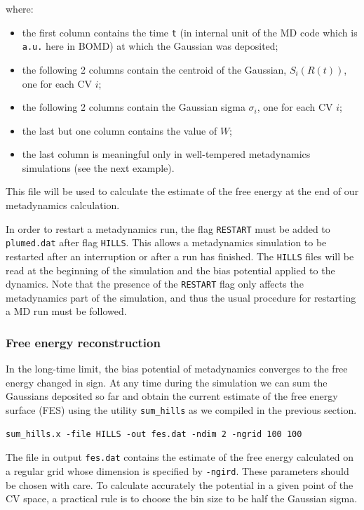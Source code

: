 \documentclass[12pt,a4paper]{article}
\begin{document}
where:

\begin{itemize}
\item the first column contains the time \texttt{t} (in internal unit of the MD code which is \texttt{a.u.} here in BOMD) at which the Gaussian was deposited;
\item the following 2 columns contain the centroid of the Gaussian, $S_{i}(R(t))$, one for each CV $i$;
\item the following 2 columns contain the Gaussian sigma $\sigma_{i}$, one for each CV $i$;
\item the last but one column contains the value of $W$;
\item the last column is meaningful only in well-tempered metadynamics simulations (see the next example).
\end{itemize}

This file will be used to calculate the estimate of the free energy at the end of our metadynamics calculation.

In order to restart a metadynamics run, the flag \texttt{RESTART} must be added to \texttt{plumed.dat} after flag \texttt{HILLS}. This allows a metadynamics simulation to be restarted after an interruption or after a run has finished. The \texttt{HILLS} files will be read at the beginning of the simulation and the bias potential applied to the dynamics. Note that the presence of the \texttt{RESTART} flag only affects the metadynamics part of the simulation, and thus the usual procedure for restarting a MD run must be followed.

\subsubsection{Free energy reconstruction}

In the long-time limit, the bias potential of metadynamics converges to the free energy changed in sign\cite{Bussi:2006gg}. At any time during the simulation we can sum the Gaussians deposited so far and obtain the current estimate of the free energy surface (FES) using the utility \texttt{sum\_hills} as we compiled in the previous section.

\begin{verbatim}
sum_hills.x -file HILLS -out fes.dat -ndim 2 -ngrid 100 100
\end{verbatim}

The file in output \texttt{fes.dat} contains the estimate of the free energy calculated on a regular grid whose dimension is specified by \texttt{-ngird}. These parameters should be chosen with care. To calculate accurately the potential in a given point of the CV space, a practical rule is to choose the bin size to be half the Gaussian sigma.
\end{document}
